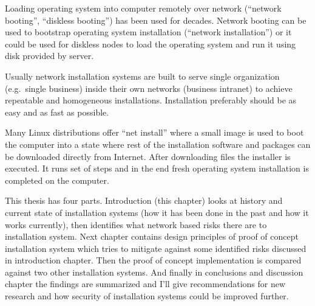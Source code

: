 
\iffalse
FIXME: TODO REMOVE THIS LIST
\begin{itemize}
\item INTRODUCTION: The Setting - bird eye's view - the challenge to be tackled / thing to be be improved in general
\item INTRODUCTION: Past research done
\item INTRODUCTION: Gap in knowledge/problem not yet solved
\item INTRODUCTION: Purpose and method of this work
\item INTRODUCTION: More detailed description what was done
\item INTRODUCTION: Results acquired
\item INTRODUCTION: Analysis and limitations of the result (Mostly relocate to Conclusions)
\item INTRODUCTION: Value (Mostly relocate to Conclusions)
\end{itemize}
\fi

Loading operating system into computer remotely over network
(``network booting'', ``diskless booting'') has been used for
decades. Network booting can be used to bootstrap operating system
installation (``network installation'') or it could be used for
diskless nodes to load the operating system and run it using disk
provided by server.

Usually network installation systems are built to serve single
organization (e.g.\ single business) inside their own networks
(business intranet) to achieve repeatable and homogeneous
installations. Installation preferably should be as easy and as fast
as possible.

Many Linux distributions offer ``net install'' where a small image is
used to boot the computer into a state where rest of the installation
software and packages can be downloaded directly from Internet. After
downloading files the installer is executed. It runs set of steps and
in the end fresh operating system installation is completed on the
computer.

This thesis has four parts. Introduction (this chapter) looks at
history and current state of installation systems (how it has been
done in the past and how it works currently), then identifies what
network based risks there are to installation system. Next chapter
contains design principles of proof of concept installation system
which tries to mitigate against some identified risks discussed in
introduction chapter. Then the proof of concept implementation is
compared against two other installation systems. And finally in
conclusions and discussion chapter the findings are summarized and
I'll give recommendations for new research and how security of
installation systems could be improved further.

